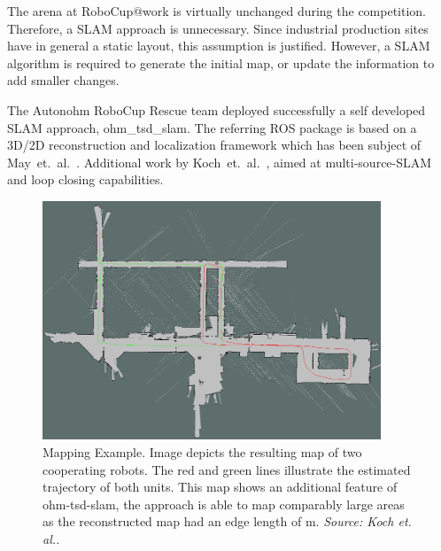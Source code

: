 
The arena at RoboCup$@$work is virtually unchanged during the competition. Therefore, a SLAM approach is unnecessary. Since industrial production sites have in general a static layout, this assumption is justified. However, a SLAM algorithm is required to generate the initial map, or update the information to add smaller changes.

The Autonohm RoboCup Rescue team deployed successfully a self developed SLAM approach, ohm\_tsd\_slam. The referring ROS package is based on a 3D/2D reconstruction and localization framework which has been subject of May~et.~al.~\cite{May2014}. Additional work by Koch~et.~al.~\cite{Koch2015}, aimed at multi-source-SLAM and loop closing capabilities. 

\begin{figure}[htb]
	\begin{center}
		\includegraphics[width=0.9\textwidth]{img/multislam_big.png}
	\end{center}
	\caption{Mapping Example. Image depicts the resulting map of two cooperating robots. The red and green lines illustrate the estimated trajectory of both units. This map shows an additional feature of ohm-tsd-slam, the approach is able to map comparably large areas as the reconstructed map had an edge length of \unit[122]{m}. \textit{Source: Koch et. al.\cite{Koch2015}.}}
	\label{fig:slam_map_expl}
\end{figure}

